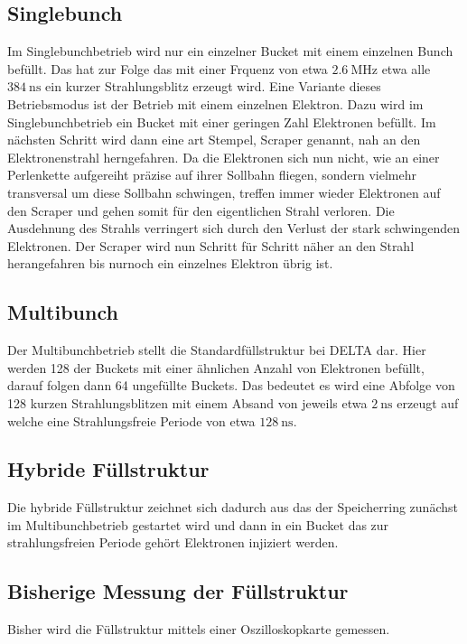 \subsection{Singlebunch}
\label{sec:Singlebunch}
Im Singlebunchbetrieb wird nur ein einzelner Bucket mit einem einzelnen Bunch befüllt. Das hat zur Folge
das mit einer Frquenz von etwa $\SI{2,6}{\mega\hertz}$ etwa alle $\SI{384}{\nano\second}$ ein kurzer 
Strahlungsblitz erzeugt wird. Eine Variante dieses Betriebsmodus ist der Betrieb mit einem einzelnen
Elektron. Dazu wird im Singlebunchbetrieb ein Bucket mit einer geringen Zahl Elektronen befüllt. Im 
nächsten Schritt wird dann eine art Stempel, Scraper genannt, nah an den Elektronenstrahl herngefahren.
Da die Elektronen sich nun nicht, wie an einer Perlenkette aufgereiht präzise auf ihrer Sollbahn fliegen,
sondern vielmehr transversal um diese Sollbahn schwingen, treffen immer wieder Elektronen auf den Scraper
und gehen somit für den eigentlichen Strahl verloren. Die Ausdehnung des Strahls verringert sich durch den 
Verlust der stark schwingenden Elektronen. Der Scraper wird nun Schritt für Schritt näher an den Strahl 
herangefahren bis nurnoch ein einzelnes Elektron übrig ist.

\subsection{Multibunch}
\label{Multibunch}
Der Multibunchbetrieb stellt die Standardfüllstruktur bei DELTA dar. Hier werden 128 der Buckets mit 
einer ähnlichen Anzahl von Elektronen befüllt, darauf folgen dann 64 ungefüllte Buckets. Das bedeutet es 
wird eine Abfolge von 128 kurzen Strahlungsblitzen mit einem Absand von jeweils etwa 
$\SI{2}{\nano\second}$ erzeugt auf welche eine Strahlungsfreie Periode von etwa $\SI{128}{\nano\second}$.


\subsection{Hybride Füllstruktur}
\label{sec:HybrideFuellstruktur}
Die hybride Füllstruktur zeichnet sich dadurch aus das der Speicherring zunächst im Multibunchbetrieb
gestartet wird und dann in ein Bucket das zur strahlungsfreien Periode gehört Elektronen injiziert werden.

\subsection{Bisherige Messung der Füllstruktur}
\label{sec:WasBisherGeschah}
Bisher wird die Füllstruktur mittels einer Oszilloskopkarte gemessen.

